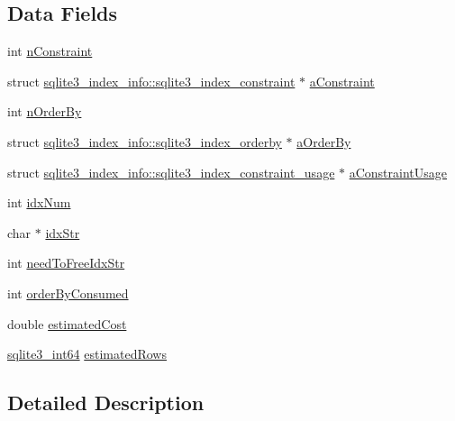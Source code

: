 \subsection*{Data Fields}
\begin{DoxyCompactItemize}
\item 
int \hyperlink{structsqlite3__index__info_ad5f4adc7482c06ccd22b2a6449a8f785}{n\+Constraint}
\item 
struct \hyperlink{structsqlite3__index__info_1_1sqlite3__index__constraint}{sqlite3\+\_\+index\+\_\+info\+::sqlite3\+\_\+index\+\_\+constraint} $\ast$ \hyperlink{structsqlite3__index__info_a4896ff0e5406c7a3679fb23e51ad1061}{a\+Constraint}
\item 
int \hyperlink{structsqlite3__index__info_a15e3c93cf5d8d7c86e94b303d48872db}{n\+Order\+By}
\item 
struct \hyperlink{structsqlite3__index__info_1_1sqlite3__index__orderby}{sqlite3\+\_\+index\+\_\+info\+::sqlite3\+\_\+index\+\_\+orderby} $\ast$ \hyperlink{structsqlite3__index__info_a60db554cfbdaf31800eb333aee3e6f1e}{a\+Order\+By}
\item 
struct \hyperlink{structsqlite3__index__info_1_1sqlite3__index__constraint__usage}{sqlite3\+\_\+index\+\_\+info\+::sqlite3\+\_\+index\+\_\+constraint\+\_\+usage} $\ast$ \hyperlink{structsqlite3__index__info_a10451bff64af6d6733c34cc2654fec91}{a\+Constraint\+Usage}
\item 
int \hyperlink{structsqlite3__index__info_afaf2ebd5db0e0ccaccbcf4e3a7391f58}{idx\+Num}
\item 
char $\ast$ \hyperlink{structsqlite3__index__info_ab783a4219cf6f1dd96437dfc6079cce5}{idx\+Str}
\item 
int \hyperlink{structsqlite3__index__info_a3459b33099539c2e615729a8f773fa16}{need\+To\+Free\+Idx\+Str}
\item 
int \hyperlink{structsqlite3__index__info_a8e78cfb50b03abaae692e669b2dc78c8}{order\+By\+Consumed}
\item 
double \hyperlink{structsqlite3__index__info_ade68ab576208e4d8be52f13f5b3f9c19}{estimated\+Cost}
\item 
\hyperlink{sqlite3_8c_a0a4d3e6c1ad46f90e746b920ab6ca0d2}{sqlite3\+\_\+int64} \hyperlink{structsqlite3__index__info_a1d100f45eba98588e7f0aaa46d31c1e5}{estimated\+Rows}
\end{DoxyCompactItemize}


\subsection{Detailed Description}


